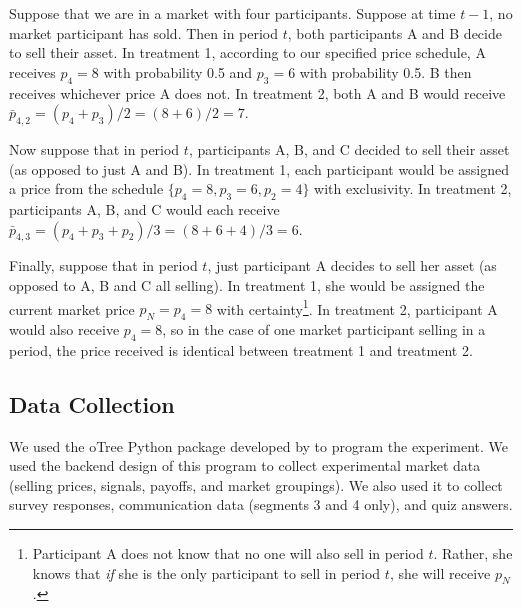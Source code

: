 \documentclass[11pt]{article}
\begin{document}
\begin{table}[H]
  \centering
  \caption{Equilibrium run-region cutoffs $\overline{\tau}$ and $\underline{\tau}$ by seller position and risk tolerance $\theta$, under the Random (Treatment~1) and Average (Treatment~2) payoff schemes. $\overline{\tau}$ marks the onset of selling ($\sigma > 0$) and $\underline{\tau}$ the onset of certain selling ($\sigma = 1$); a run occurs for $\pi = \Pr(z = G) < \overline{\tau}$.}
  \label{tab:equilibrium_tau_cutoffs}
  
\end{table}


\vspace{0.5in}

Suppose that we are in a market with four participants. Suppose at time $t-1$, no market participant has sold. Then in period $t$, both participants A and B decide to sell their asset. In treatment 1, according to our specified price schedule, A receives $p_4 = 8$ with probability 0.5 and $p_3 = 6$ with probability 0.5. B then receives whichever price A does not. In treatment 2, both A and B would receive $\bar{p}_{4,2} = (p_4+p_3)/2 = (8+6)/2 = 7$.

Now suppose that in period $t$, participants A, B, and C decided to sell their asset (as opposed to just A and B). In treatment 1, each participant would be assigned a price from the schedule $\{p_4=8,p_3=6,p_2=4\}$ with exclusivity. In treatment 2, participants A, B, and C would each receive $\bar{p}_{4,3} = (p_4+p_3+p_2)/3 = (8+6+4)/3 = 6$.

Finally, suppose that in period $t$, just participant A decides to sell her asset (as opposed to A, B and C all selling). In treatment 1, she would be assigned the current market price $p_N = p_4 = 8$ with certainty\footnote{Participant A does not know that no one will also sell in period $t$. Rather, she knows that \textit{if} she is the only participant to sell in period $t$, she will receive $p_N$.}. In treatment 2, participant A would also receive $p_4 = 8$, so in the case of one market participant selling in a period, the price received is identical between treatment 1 and treatment 2. 

\subsection{Data Collection}
We used the oTree  Python package developed by \cite{otree} to program the experiment. We used the backend design of this program to collect experimental market data (selling prices, signals, payoffs, and market groupings). We also used it to collect survey responses, communication data (segments 3 and 4 only), and quiz answers. 
\end{document}
